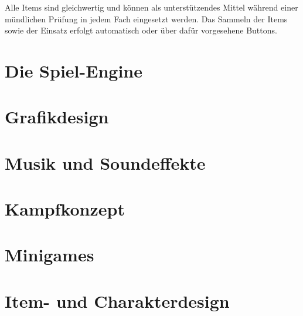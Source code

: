 Alle Items sind gleichwertig und können als unterstützendes Mittel während einer mündlichen Prüfung in jedem Fach eingesetzt werden. Das Sammeln der Items sowie der Einsatz erfolgt automatisch oder über dafür vorgesehene Buttons.

\section{Die Spiel-Engine}


\section{Grafikdesign}


\section{Musik und Soundeffekte}


\section{Kampfkonzept}


\section{Minigames}


\section{Item- und Charakterdesign}



